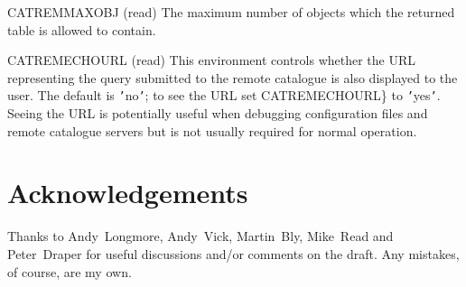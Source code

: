 \documentclass[twoside,11pt]{article}
\renewcommand{\_}{\texttt{\symbol{95}}}
\begin{document}
\begin{htmlonly}
{{      CATREM\_MAXOBJ (read)
         The maximum number of objects which the returned table is allowed
         to contain.

      CATREM\_ECHOURL (read)
         This environment controls whether the URL representing the query
         submitted to the remote catalogue is also displayed to the user.
         The default is {\tt '}no{\tt '}; to see the URL set CATREM\_ECHOURL\} to {\tt '}yes{\tt '}.
         Seeing the URL is potentially useful when debugging configuration
         files and remote catalogue servers but is not usually required
         for normal operation.
   }
}

\end{htmlonly}


\section{Acknowledgements}

Thanks to Andy~Longmore, Andy~Vick, Martin~Bly, Mike~Read and Peter~Draper
for useful discussions and/or comments on the draft.  Any mistakes, of
course, are my own.



\newpage
\end{document}
